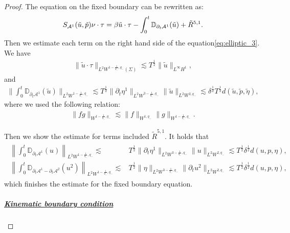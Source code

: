 \documentclass[letterpaper,reqno,10pt,twoside]{amsart}
\theoremstyle{definition}
\theoremstyle{remark}
\def\p{\partial}
\begin{document}
\begin{proof}
			The equation on the fixed boundary can be rewritten as:
			\begin{align}{\label{eq:elliptic_3}}
				S_{\mathcal{A}^{1}}(\tilde{u},\tilde{p})\nu \cdot \tau=\beta \tilde{u}\cdot \tau-\int_{0}^{t}\mathbb{D}_{\p_{t}\mathcal{A}^{1}}(\tilde{u})+\tilde{R}^{5,1}.
			\end{align}
			\noindent Then we estimate each term on the right hand side of the equation\eqref{eq:elliptic_3}. We have
			\begin{align}
				\|\tilde{u}\cdot \tau\|_{L^{2}W^{1-\frac{1}{q_{-}},q_{-}}(\Sigma)}\lesssim T^{\frac{1}{2}}\|\tilde{u}\|_{L^{\infty}H^{1}},
			\end{align}
			\noindent and
			\begin{align}
				\|\int_{0}^{t}\mathbb{D}_{\p_{t}\mathcal{A}^{1}}(\tilde{u})\|_{L^{2}W^{1-\frac{1}{q_{-}},q_{-}}}\lesssim T^{\frac{1}{2}}\|\p_{t}\eta^{1}\|_{L^{2}W^{3-\frac{1}{q_{-}},q_{-}}}\|\tilde{u}\|_{L^{2}W^{2,q_{-}}}\lesssim\delta^{\frac{1}{2}}T^{\frac{1}{2}}d(\tilde{u},\tilde{p},\tilde{\eta}),
			\end{align}
			\noindent where we used the following relation:
			\begin{align}
				\|fg\|_{W^{1-\frac{1}{q_{-}},q_{-}}}\lesssim \|f\|_{W^{1,q_{-}}}\|g\|_{W^{1-\frac{1}{q_{-}},q_{-}}}.
			\end{align}
			
			\noindent Then we show the estimate for terms included $\tilde{R}^{5,1}$. It holds that
			\begin{align}
				\begin{aligned}
					\left\|\int_{0}^{t}\mathbb{D}_{\p_{t}\mathcal{A}^{1}}({u}) \right\|_{L^{2}W^{1-\frac{1}{q_{-}},q_{-}}}\lesssim&T^{\frac{1}{2}}\|\p_{t}\eta^{1}\|_{L^{2}W^{3-\frac{1}{q_{-}},q_{-}}}\|{u}\|_{L^{2}W^{2,q_{-}}}\lesssim T^{\frac{1}{2}}\delta^{\frac{1}{2}}d({u},{p},{\eta}),\\
					\left\|\int_{0}^{t}\mathbb{D}_{\p_{t}\mathcal{A}^{1}-\p_{t}\mathcal{A}^{2}}({u}^{2}) \right\|_{L^{2}W^{1-\frac{1}{q_{-}},q_{-}}}\lesssim&T^{\frac{1}{2}}\|\eta\|_{L^{2}W^{3-\frac{1}{q_{-}},q_{-}}}\|\p_{t}{u}^{2}\|_{L^{2}W^{2,q_{-}}}\lesssim T^{\frac{1}{2}}\delta^{\frac{1}{2}}d({u},{p},{\eta}),
				\end{aligned}
			\end{align}
			\noindent which finishes the estimate for the fixed boundary equation.
			
			\subparagraph{\underline{Kinematic boundary condition}}
			

\end{proof}
\end{document}
